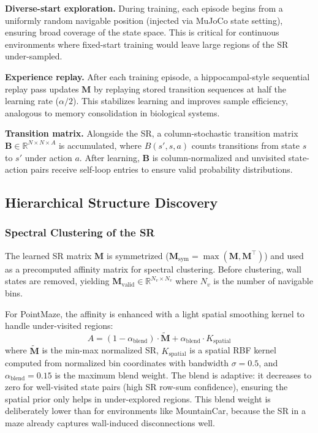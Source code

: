 \documentclass[11pt,a4paper]{article}
\newcommand{\M}{\mathbf{M}}
\newcommand{\B}{\mathbf{B}}
\newcommand{\R}{\mathbb{R}}
\begin{document}
\textbf{Diverse-start exploration.}
During training, each episode begins from a uniformly random navigable position (injected via MuJoCo state setting), ensuring broad coverage of the state space.
This is critical for continuous environments where fixed-start training would leave large regions of the SR under-sampled.

\textbf{Experience replay.}
After each training episode, a hippocampal-style sequential replay pass updates $\M$ by replaying stored transition sequences at half the learning rate ($\alpha/2$).
This stabilizes learning and improves sample efficiency, analogous to memory consolidation in biological systems.

\textbf{Transition matrix.}
Alongside the SR, a column-stochastic transition matrix $\B \in \R^{N \times N \times A}$ is accumulated, where $B(s', s, a)$ counts transitions from state $s$ to $s'$ under action $a$.
After learning, $\B$ is column-normalized and unvisited state-action pairs receive self-loop entries to ensure valid probability distributions.

\subsection{Hierarchical Structure Discovery}
\label{sec:hierarchy}

\subsubsection{Spectral Clustering of the SR}

The learned SR matrix $\M$ is symmetrized ($\M_{\text{sym}} = \max(\M, \M^\top)$) and used as a precomputed affinity matrix for spectral clustering.
Before clustering, wall states are removed, yielding $\M_{\text{valid}} \in \R^{N_v \times N_v}$ where $N_v$ is the number of navigable bins.

For PointMaze, the affinity is enhanced with a light spatial smoothing kernel to handle under-visited regions:
\begin{equation}
    A = (1 - \alpha_{\text{blend}}) \cdot \tilde{\M} + \alpha_{\text{blend}} \cdot K_{\text{spatial}}
    \label{eq:affinity_blend}
\end{equation}
where $\tilde{\M}$ is the min-max normalized SR, $K_{\text{spatial}}$ is a spatial RBF kernel computed from normalized bin coordinates with bandwidth $\sigma = 0.5$, and $\alpha_{\text{blend}} = 0.15$ is the maximum blend weight.
The blend is adaptive: it decreases to zero for well-visited state pairs (high SR row-sum confidence), ensuring the spatial prior only helps in under-explored regions.
This blend weight is deliberately lower than for environments like MountainCar, because the SR in a maze already captures wall-induced disconnections well.
\end{document}
